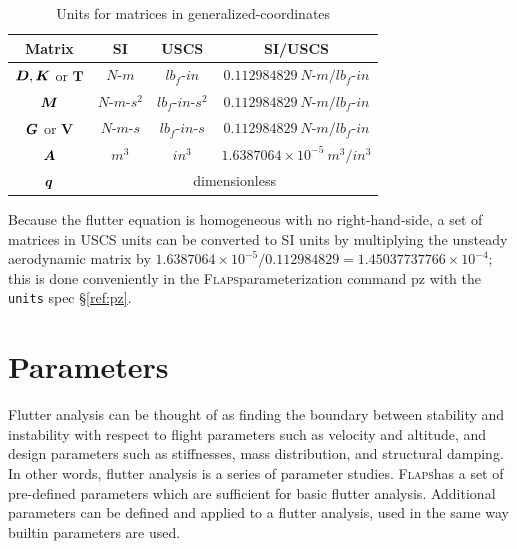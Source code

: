 \documentclass[11pt,openany,twoside]{book}
\numberwithin{equation}{section}		%
\newcommand{\Cmd}[1]{{\sf #1}}
\newcommand{\Code}[1]{{\small\tt #1}}
\newcommand{\Flaps}{\textsc{Flaps\:}}
\newcommand{\Matrix}[1]{\boldsymbol{#1}}
\newcommand{\Vector}[1]{\boldsymbol{#1}}
\newcommand{\Sectref}[1]{\S\ref{#1}}
\begin{document}
\begin{table}[hbt] %
\begin{center}
\begin{small}
\begin{sloppypar}
\begin{tabular}{|c|c|c|c|} \hline
{\bf Matrix}       & {\bf SI }   & {\bf USCS}  & {\bf SI/USCS}     \\ \hline \hline
$\rule{0mm}{4mm} \Matrix{D}, \Matrix{K}$ or $\Matrix{T}$ & $N\text{-}m$ & $lb_f\text{-}in$ & $0.112984829 \: N\text{-}m/lb_f\text{-}in$  \\ \hline
$\rule{0mm}{4mm} \Matrix{M}$  & $N\text{-}m\text{-}s^2$         & $lb_f\text{-}in\text{-}s^2$ & $0.112984829 \: N\text{-}m/lb_f\text{-}in$  \\ \hline
$\rule{0mm}{4mm} \Matrix{G}$ or $\Matrix{V}$ & $N\text{-}m\text{-}s$ &
		$lb_f\text{-}in\text{-}s$ & $0.112984829 \: N\text{-}m/lb_f\text{-}in$ \\ \hline
$\rule{0mm}{4mm} \Matrix{A}$     & $m^3$ & $in^3$ & $1.6387064 \times 10^{-5} \: m^3/in^3$     \\ \hline
$\rule{0mm}{4mm}\Vector{q}$ & \multicolumn{3}{c|}{dimensionless}                             \\ \hline
\end{tabular}
\end{sloppypar}
\end{small}
\end{center}
\caption{Units for matrices in generalized-coordinates} \label{table:matrix-units}
\end{table}
Because the flutter equation is homogeneous with no right-hand-side, a set
of matrices in USCS units can be converted to SI units by multiplying the unsteady
aerodynamic matrix by
$1.6387064\times10^{-5}/0.112984829 = 1.45037737766 \times 10^{-4}$;
this is done conveniently in the \Flaps parameterization command
\Cmd{pz} with the \Code{units} spec \Sectref{ref:pz}.

\newpage
\chapter{Parameters}\label{chap:parameters}
Flutter analysis can be thought of as finding the boundary
between stability and instability with respect to flight parameters
such as velocity and altitude, and design parameters such as
stiffnesses, mass distribution, and structural damping.
In other words, flutter analysis is a series of parameter studies.
\Flaps has a set of pre-defined parameters which are sufficient for
basic flutter analysis. Additional parameters can be defined and
applied to a flutter analysis, used in the same way builtin parameters
are used.
\end{document}
